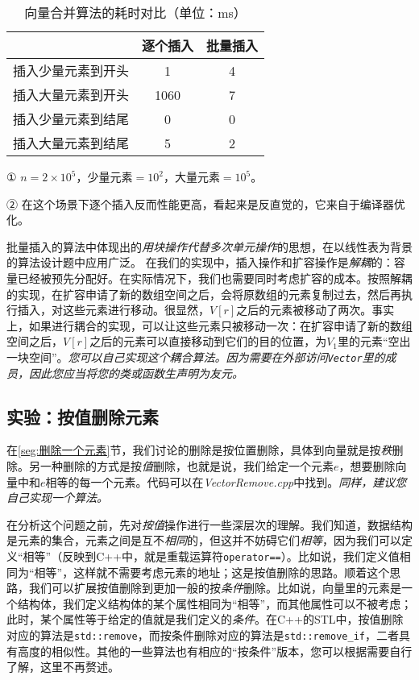 \begin{table}
  \centering
  \begin{threeparttable}[c]
  \caption{向量合并算法的耗时对比（单位：ms）}
  \begin{tabular}{c|cc}
    \toprule
      \tnote{①}  & 逐个插入 & 批量插入  
      \\
    \midrule
    插入少量元素到开头 & 1\tnote{②} & 4 \\
    插入大量元素到开头 & 1060 & 7 \\
    插入少量元素到结尾 & 0 & 0 \\
    插入大量元素到结尾 & 5 & 2 \\ 
    \bottomrule
  \end{tabular}
  \begin{tablenotes}
      \item [①] $n=2\times10^5$，少量元素$=10^2$，大量元素$=10^5$。
      \item [②] 在这个场景下逐个插入反而性能更高，看起来是反直觉的，它来自于编译器优化。
    \end{tablenotes}
  \label{tab:vec2}
  \end{threeparttable}
\end{table}

批量插入的算法中体现出的\textit{用块操作代替多次单元操作}的思想，在以线性表为背景的算法设计题中应用广泛。
在我们的实现中，插入操作和扩容操作是\textit{解耦}的：容量已经被预先分配好。在实际情况下，我们也需要同时考虑扩容的成本。按照解耦的实现，在扩容申请了新的数组空间之后，会将原数组的元素复制过去，然后再执行插入，对这些元素进行移动。很显然，$V[r]$之后的元素被移动了两次。事实上，如果进行耦合的实现，可以让这些元素只被移动一次：在扩容申请了新的数组空间之后，$V[r]$之后的元素可以直接移动到它们的目的位置，为$V_1$里的元素“空出一块空间”。\textit{您可以自己实现这个耦合算法。因为需要在外部访问\lstinline{Vector}里的成员，因此您应当将您的类或函数生声明为友元。}

\subsection{实验：按值删除元素}
\label{sec:按值删除元素}
在\ref{seg:删除一个元素}节，我们讨论的删除是按位置删除，具体到向量就是按\textit{秩}删除。另一种删除的方式是按\textit{值}删除，也就是说，我们给定一个元素$e$，想要删除向量中和$e$相等的每一个元素。代码可以在\textit{VectorRemove.cpp}中找到。\textit{同样，建议您自己实现一个算法。}

在分析这个问题之前，先对\textit{按值}操作进行一些深层次的理解。我们知道，数据结构是元素的集合，元素之间是互不\textit{相同}的，但这并不妨碍它们\textit{相等}，因为我们可以定义“相等”（反映到C++中，就是重载运算符\lstinline{operator==}）。比如说，我们定义值相同为“相等”，这样就不需要考虑元素的地址；这是按值删除的思路。顺着这个思路，我们可以扩展按值删除到更加一般的按\textit{条件}删除。比如说，向量里的元素是一个结构体，我们定义结构体的某个属性相同为“相等”，而其他属性可以不被考虑；此时，某个属性等于给定的值就是我们定义的\textit{条件}。在C++的STL中，按值删除对应的算法是\lstinline{std::remove}，而按条件删除对应的算法是\lstinline{std::remove_if}，二者具有高度的相似性。其他的一些算法也有相应的“按条件”版本，您可以根据需要自行了解，这里不再赘述。

